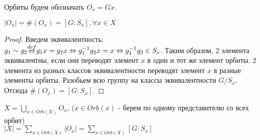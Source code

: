 Орбиты будем обозначать $O_x = Gx$.

\begin{thm}
$|O_x| = \#(O_x) = [G : S_x], \forall x \in X$
\end{thm}
\begin{proof}
Введем эквивалентность: $g_1 \sim g_2 {\buildrel{def}\over{\Leftrightarrow}} g_1x = g_2x
\Leftrightarrow g^{-1}_1g_2x = x \Leftrightarrow g^{-1}_1g_2 \in S_x$. Таким образом, 2 элемента эквивалентны, если они
переводят элемент $x$ в один и тот же элемент орбиты. 2 элемента из разных классов эквивалентности переводят элемент $x$ в
разные элементы орбиты. Разобьем всю группу на классы эквивалентности $G/S_x$. Отсюда $\#(O_x) = [G : S_x]$.
\end{proof}

\begin{thm}
$X = {\underset{x \in Orb(X)}{\bigcup}}O_x$, ($x \in Orb(x)$ - берем по одному представителю со всех орбит) \\
$|X| = {\underset{x \in Orb(X)}{\sum}}|O_x| = {\underset{x \in Orb(X)}{\sum}}[G : S_x]$
\end{thm}


